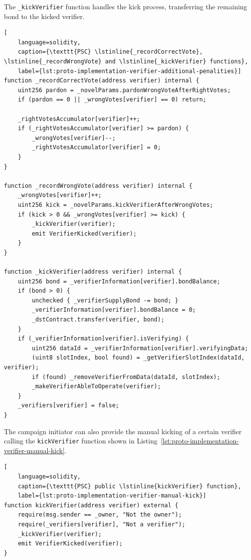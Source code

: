 The \lstinline{_kickVerifier} function handles the kick process, transferring the remaining bond to the kicked verifier.

\begin{lstlisting}[
    language=solidity,
    caption={\texttt{PSC} \lstinline{_recordCorrectVote}, \lstinline{_recordWrongVote} and \lstinline{_kickVerifier} functions},
    label={lst:proto-implementation-verifier-additional-penalities}]
function _recordCorrectVote(address verifier) internal {
    uint256 pardon = _novelParams.pardonWrongVoteAfterRightVotes;
    if (pardon == 0 || _wrongVotes[verifier] == 0) return;

    _rightVotesAccumulator[verifier]++;
    if (_rightVotesAccumulator[verifier] >= pardon) {
        _wrongVotes[verifier]--;
        _rightVotesAccumulator[verifier] = 0;
    }
}

function _recordWrongVote(address verifier) internal {
    _wrongVotes[verifier]++;
    uint256 kick = _novelParams.kickVerifierAfterWrongVotes;
    if (kick > 0 && _wrongVotes[verifier] >= kick) {
        _kickVerifier(verifier);
        emit VerifierKicked(verifier);
    }
}

function _kickVerifier(address verifier) internal {
    uint256 bond = _verifierInformation[verifier].bondBalance;
    if (bond > 0) {
        unchecked { _verifierSupplyBond -= bond; }
        _verifierInformation[verifier].bondBalance = 0;
        _dstContract.transfer(verifier, bond);
    }
    if (_verifierInformation[verifier].isVerifying) {
        uint256 dataId = _verifierInformation[verifier].verifyingData;
        (uint8 slotIndex, bool found) = _getVerifierSlotIndex(dataId, verifier);
        if (found) _removeVerifierFromData(dataId, slotIndex);
        _makeVerifierAbleToOperate(verifier);
    }
    _verifiers[verifier] = false;
}
\end{lstlisting}

The campaign initiator can also provide the manual kicking of a certain verifier calling the \lstinline{kickVerifier} function shown in Listing~\ref{lst:proto-implementation-verifier-manual-kick}.

\begin{lstlisting}[
    language=solidity,
    caption={\texttt{PSC} public \lstinline{kickVerifier} function},
    label={lst:proto-implementation-verifier-manual-kick}]
function kickVerifier(address verifier) external {
    require(msg.sender == _owner, "Not the owner");
    require(_verifiers[verifier], "Not a verifier");
    _kickVerifier(verifier);
    emit VerifierKicked(verifier);
}
\end{lstlisting}


